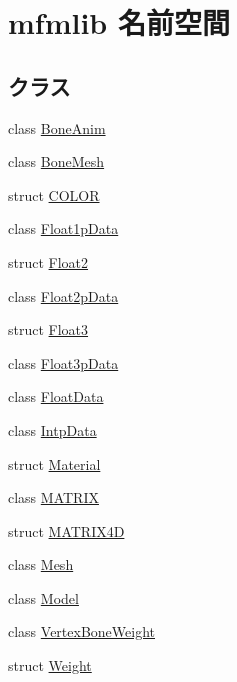 \hypertarget{namespacemfmlib}{}\section{mfmlib 名前空間}
\label{namespacemfmlib}
\subsection*{クラス}
\begin{DoxyCompactItemize}
\item 
class \mbox{\hyperlink{classmfmlib_1_1_bone_anim}{Bone\+Anim}}
\item 
class \mbox{\hyperlink{classmfmlib_1_1_bone_mesh}{Bone\+Mesh}}
\item 
struct \mbox{\hyperlink{structmfmlib_1_1_c_o_l_o_r}{C\+O\+L\+OR}}
\item 
class \mbox{\hyperlink{classmfmlib_1_1_float1p_data}{Float1p\+Data}}
\item 
struct \mbox{\hyperlink{structmfmlib_1_1_float2}{Float2}}
\item 
class \mbox{\hyperlink{classmfmlib_1_1_float2p_data}{Float2p\+Data}}
\item 
struct \mbox{\hyperlink{structmfmlib_1_1_float3}{Float3}}
\item 
class \mbox{\hyperlink{classmfmlib_1_1_float3p_data}{Float3p\+Data}}
\item 
class \mbox{\hyperlink{classmfmlib_1_1_float_data}{Float\+Data}}
\item 
class \mbox{\hyperlink{classmfmlib_1_1_intp_data}{Intp\+Data}}
\item 
struct \mbox{\hyperlink{structmfmlib_1_1_material}{Material}}
\item 
class \mbox{\hyperlink{classmfmlib_1_1_m_a_t_r_i_x}{M\+A\+T\+R\+IX}}
\item 
struct \mbox{\hyperlink{structmfmlib_1_1_m_a_t_r_i_x4_d}{M\+A\+T\+R\+I\+X4D}}
\item 
class \mbox{\hyperlink{classmfmlib_1_1_mesh}{Mesh}}
\item 
class \mbox{\hyperlink{classmfmlib_1_1_model}{Model}}
\item 
class \mbox{\hyperlink{classmfmlib_1_1_vertex_bone_weight}{Vertex\+Bone\+Weight}}
\item 
struct \mbox{\hyperlink{structmfmlib_1_1_weight}{Weight}}
\end{DoxyCompactItemize}
